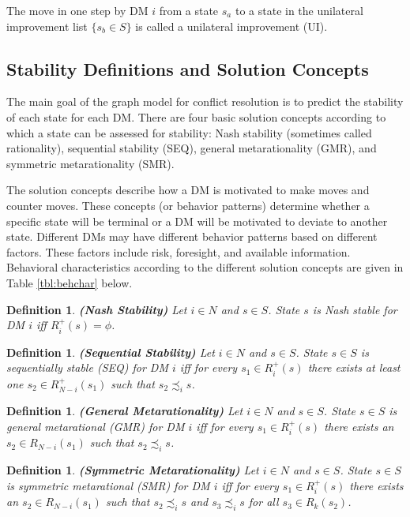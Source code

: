 \documentclass[letterpaper,12pt,titlepage,oneside,final]{book}
\newtheorem{definition}[lemma]{Definition}
\begin{document}
The move in one step by DM $i$ from a state $s_a$ to a state in the unilateral improvement list $\{s_b\in S\}$ is called a unilateral improvement (UI).

\subsection{Stability Definitions and Solution Concepts}

The main goal of the graph model for conflict resolution is to predict the stability of each state for each DM. There are four basic solution concepts according to which a state can be assessed for stability: Nash stability (sometimes called rationality), sequential stability (SEQ), general metarationality (GMR), and  symmetric metarationality (SMR). 

The solution concepts describe how a DM is motivated to make moves and counter moves. These concepts (or behavior patterns) determine whether a specific state will be terminal or a DM will be motivated to deviate to another state. Different DMs may have different behavior patterns based on different factors. These factors include risk, foresight, and available information. Behavioral characteristics according to the different solution concepts are given in Table \ref{tbl:behchar} below. 

\begin{definition}
\rm {\bf (Nash Stability)} Let $i \in N$ and $s \in
S$. State $s$ is \emph{Nash stable} for DM $i$ \emph{iff} $R_i^+(s)=\phi$.
\end{definition}

\begin{definition}
\rm {\bf (Sequential Stability)} Let $i \in N$ and $s \in
S$. State $s \in S$ is \emph{sequentially stable} (\emph{SEQ}) for DM $i$ \emph{iff} for every $s_1 \in R_i^+(s)$ there exists at least one $s_2 \in R_{N-i}^+(s_1)$
such that $s_2 \precsim_i s$.
\end{definition}

\begin{definition}
\rm {\bf (General Metarationality)} Let $i \in N$ and $s \in
S$. State $s \in S$ is \emph{general metarational} (\emph{GMR}) for DM $i$ \emph{iff} for every $s_1 \in R_i^+(s)$ there exists an $s_2 \in
R_{N-i}(s_1)$ such that $s_2 \precsim_i s$.
\end{definition}

\begin{definition}
\rm {\bf (Symmetric Metarationality)}  Let $i \in N$ and $s \in
S$. State $s \in S$ is \emph{symmetric metarational} (\emph{SMR}) for DM $i$ \emph{iff} for every $s_1 \in R_i^+(s)$ there exists an $s_2 \in
R_{N-i}(s_1)$ such that $s_2 \precsim_i s$ and $s_3 \precsim_i s$
for all $s_3 \in R_k(s_2)$.
\end{definition}
\end{document}
